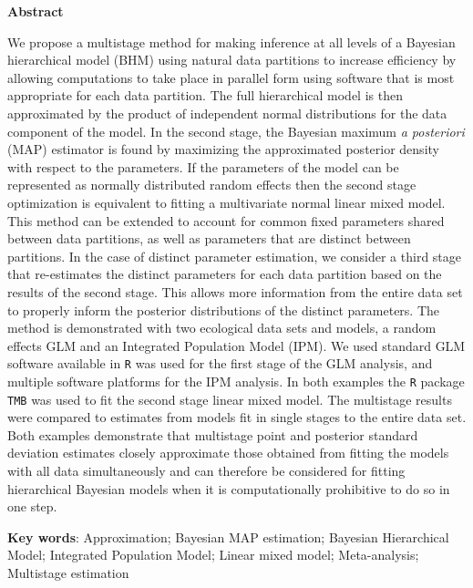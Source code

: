 \documentclass[12pt]{article}
\begin{document}
\vspace*{\fill}
\begin{center}
\begin{minipage}{0.65\paperwidth}
\renewcommand{\baselinestretch}{1}\normalsize

\centerline{\bf Abstract} 
We propose a multistage method for making inference at all levels of a Bayesian hierarchical model (BHM) using natural data partitions to increase efficiency by allowing computations to take place in parallel form using software that is most appropriate for each data partition. The full hierarchical model is then approximated by the product of independent normal distributions for the data component of the model. In the second stage, the Bayesian maximum {\it a posteriori} (MAP) estimator is found by maximizing the approximated posterior density with respect to the parameters. If the parameters of the model can be represented as normally distributed random effects then the second stage optimization is equivalent to fitting a multivariate normal linear mixed model. This method can be extended to account for common fixed parameters shared between data partitions, as well as parameters that are distinct between partitions. In the case of distinct parameter estimation, we consider a third stage that re-estimates the distinct parameters for each data partition based on the results of the second stage. This allows more information from the entire data set to properly inform the posterior distributions of the distinct parameters. The method is demonstrated with two ecological data sets and models, a random effects GLM and an Integrated Population Model (IPM). We used standard GLM software available in {\tt R} was used for the first stage of the GLM analysis, and multiple software platforms for the IPM analysis. In both examples the {\tt R} package {\tt TMB} was used to fit the second stage linear mixed model. The multistage results were compared to estimates from models fit in single stages to the entire data set. Both examples demonstrate that multistage point and posterior standard deviation estimates closely approximate those obtained from fitting the models with all data simultaneously and can therefore be considered for fitting hierarchical Bayesian models when it is computationally prohibitive to do so in one step.     

\bigskip

{\bf Key words}: Approximation; Bayesian MAP estimation; Bayesian Hierarchical Model; Integrated Population Model; Linear mixed model; Meta-analysis; Multistage estimation
\end{minipage}
\end{center}
\end{document}
